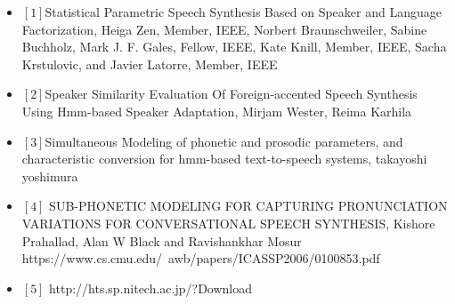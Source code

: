 \begin{itemize}
\item $[1]$Statistical Parametric Speech Synthesis Based on Speaker and Language Factorization, Heiga Zen, Member, IEEE, Norbert Braunschweiler, Sabine Buchholz, Mark J. F. Gales, Fellow, IEEE, Kate Knill, Member, IEEE, Sacha Krstulovic, and Javier Latorre, Member, IEEE
\item $[2]$Speaker Similarity Evaluation Of Foreign-accented Speech Synthesis Using Hmm-based Speaker Adaptation, Mirjam Wester, Reima Karhila
\item $[3]$Simultaneous Modeling of phonetic and prosodic parameters, and characteristic conversion for hmm-based text-to-speech systems, takayoshi yoshimura
\item $[4]$ SUB-PHONETIC MODELING FOR CAPTURING PRONUNCIATION VARIATIONS FOR CONVERSATIONAL SPEECH SYNTHESIS, Kishore Prahallad, Alan W Black and Ravishankhar Mosur https://www.cs.cmu.edu/~awb/papers/ICASSP2006/0100853.pdf
\item $[5]$ http://hts.sp.nitech.ac.jp/?Download
\end{itemize}